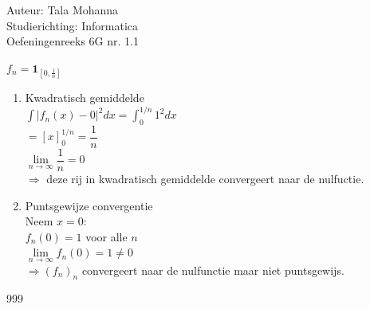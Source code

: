 \documentclass[a4paper]{article}
\newcommand{\dint}{\displaystyle\int}
\begin{document}
  
\noindent \large Auteur: Tala Mohanna \\
\noindent \large Studierichting: Informatica\\
\noindent \large Oefeningenreeks 6G nr. 1.1\\

\medskip

\normalsize

$ f_n = \mathbf{1}_{\left[0, \tfrac{1}{n}\right]} $ \\

\begin{enumerate}

\item Kwadratisch gemiddelde\\

$ \dint |f_n(x) - 0|^2 dx = \dint_0^{1/n} 1^2 dx $ \\

$ = \left[ x \right]_0^{1/n} = \dfrac{1}{n} $  \\

$ \lim\limits_{n \rightarrow \infty} \dfrac{1}{n} = 0 $ \\

$ \Rightarrow $ deze rij in kwadratisch gemiddelde convergeert naar de nulfuctie. \\

\item Puntsgewijze convergentie\\

Neem $ x = 0 $: \\

$ f_n(0) = 1 $ voor alle $ n $ \\

$ \lim\limits_{n \rightarrow \infty} f_n(0) = 1 \neq 0 $ \\

$ \Rightarrow (f_n)_n $ convergeert naar de nulfunctie maar niet puntsgewijs. \\

\end{enumerate}

\begin{thebibliography}{999}
\end{thebibliography}
\end{document}
